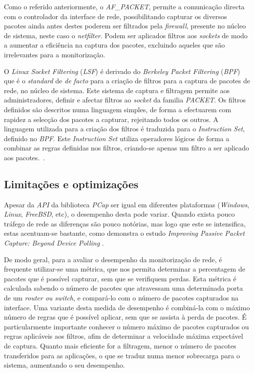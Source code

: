 Como o referido anteriormente, o \textit{AF\_PACKET}, permite a comunicação directa com o controlador da interface de rede, possibilitando capturar os diversos pacotes ainda antes destes poderem ser filtrados pela \textit{firewall}, presente no núcleo de sistema, neste caso o \textit{netfilter}.
Podem ser aplicados filtros aos \textit{sockets} de modo a aumentar a eficiência na captura dos pacotes, excluindo aqueles que são irrelevantes para a monitorização.

O \textit{Linux Socket Filtering} (\textit{LSF}) é derivado do \textit{Berkeley Packet Filtering} (\textit{BPF}) que é o \textit{standard} de \textit{de facto} para a criação de filtros para a captura de pacotes de rede, no núcleo de sistema.
Este sistema de captura e filtragem permite aos administradores, definir e afectar filtros ao \textit{socket} da familia \textit{PACKET}.
Os filtros definidos são descritos numa linguagem simples, de forma a efectuarem com rapidez a selecção dos pacotes a capturar, rejeitando todos os outros.
A linguagem utilizada para a criação dos filtros é traduzida para o \textit{Instruction Set}, definido no \textit{BPF}.
Este \textit{Instruction Set} utiliza operadores lógicos de forma a combinar as regras definidas nos filtros, criando-se apenas um filtro a ser aplicado aos pacotes.~\cite{Mccanne92thebsd}.

\subsection{Limitações e optimizações}
Apesar da \textit{API} da biblioteca \textit{PCap} ser igual em diferentes plataformas (\textit{Windows}, \textit{Linux}, \textit{FreeBSD}, etc), o desempenho desta pode variar.
Quando exista pouco tráfego de rede as diferenças são pouco notórias, mas logo que este se intensifica, estas acentuam-se bastante, como demonstra o estudo \textit{Improving Passive Packet Capture: Beyond Device Polling} \cite{Deri2004}.

De modo geral, para a avaliar o desempenho da monitorização de rede, é frequente utilizar-se uma métrica, que nos permita determinar a percentagem de pacotes que é possível capturar, sem que se verifiquem perdas.
Esta métrica é calculada sabendo o número de pacotes que atravessam uma determinada porta de um \textit{router ou switch}, e compará-lo com o número de pacotes capturados na interface.
Uma variante desta medida de desempenho é combiná-la com o máximo número de regras que é possível aplicar, sem que se assista à perda de pacotes.
É particularmente importante conhecer o número máximo de pacotes capturados ou regras aplicáveis aos filtros, afim de determinar a velocidade máxima expectável de captura.
Quanto mais eficiente for a filtragem, menor o número de pacotes transferidos para as aplicações, o que se traduz numa menor sobrecarga para o sistema, aumentando o seu desempenho.

